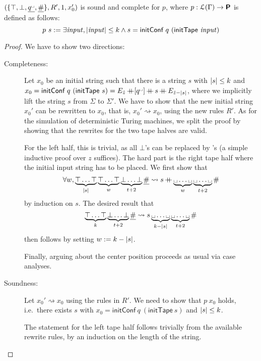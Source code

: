 \documentclass[a4paper,UKenglish,cleveref, autoref]{lipics-v2019}
\newcommand{\strent}{\rightsquigarrow}
\begin{document}
\begin{lemma}\label{lem:nondetsc}
  $(\{\top, \bot, \underline{q^\blank}, \underline{\#}\}, R', 1, x_0')$ is sound and complete for $p$, where $p : \mathcal{L} (\Gamma) \rightarrow \textsf{\bfseries P}$ is defined as follows: 
  \[p~s := \exists \mathit{input}, |\mathit{input}| \le k \land s = \textsf{initConf}~q~(\textsf{initTape}~\mathit{input})\]
\end{lemma}
\begin{proof}
  We have to show two directions:
  \begin{description}
  	\item[Completeness:]
      Let $x_0$ be an initial string such that there is a string $s$ with $|s| \le k$ and $x_0 = \textsf{initConf}~q~(\textsf{initTape}~s) = E_{\hat{z}} \concat [q^\blank] \concat s \concat E_{\hat{z} - \length{s}}$, where we implicitly lift the string $s$ from $\Sigma$ to $\Sigma'$. We have to show that the new initial string $x_0'$ can be rewritten to $x_0$, that is, $x_0' \strent{} x_0$, using the new rules $R'$. As for the simulation of deterministic Turing machines, we split the proof by showing that the rewrites for the two tape halves are valid.

      For the left half, this is trivial, as all $\bot$'s can be replaced by \blank's (a simple inductive proof over $z$ suffices). The hard part is the right tape half where the initial input string has to be placed.
      We first show that 
      \[ \forall w, \underbrace{\top \ldots \top}_{\length{s}} \underbrace{\top \ldots \top}_{w} \underbrace{\bot \ldots \bot}_{t + 2}\underline{\#} \strent{} s \concat \underbrace{\blank \ldots \blank}_{w} \underbrace{\blank \ldots \blank}_{t+2}\# \]
      by induction on $s$. The desired result that 
      \[\underbrace{\top \ldots \top}_{k} \underbrace{\bot \ldots \bot}_{t+2}\underline{\#} \strent{} s \underbrace{\blank \ldots \blank}_{k-\length{s}} \underbrace{\blank \ldots \blank}_{t+2}\# \]
      then follows by setting $w := k - |s|$. 

      Finally, arguing about the center position proceeds as usual via case analyses.

  	\item[Soundness:]
      Let $x_0' \strent{} x_0$ using the rules in $R'$. We need to show that $p~x_0$ holds, i.e.\ there exists $s$ with $x_0 = \textsf{initConf}~q~(\textsf{initTape}~s)$ and $|s| \le k$. 
      
      The statement for the left tape half follows trivially from the available rewrite rules, by an induction on the length of the string. 


\end{description}
\end{proof}
\end{document}
